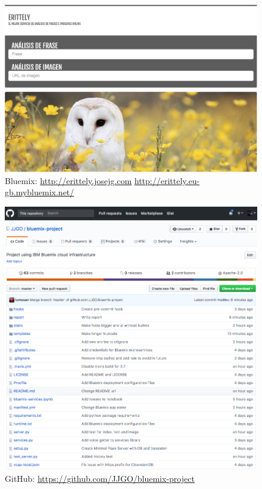 \documentclass[a4paper]{article}
\begin{document}
\begin{figure}[htp!]
    \centering
    \caption{Bluemix: \url{http://erittely.josejg.com} \newline{} \url{http://erittely.eu-gb.mybluemix.net/} }
    \label{fig:blue}
    \includegraphics[width=\textwidth]{blue}
\end{figure}


\begin{figure}[htp!]
    \centering
    \caption{GitHub: \url{https://github.com/JJGO/bluemix-project}}
    \label{fig:git}
    \includegraphics[width=\textwidth]{git}
\end{figure}
\end{document}
